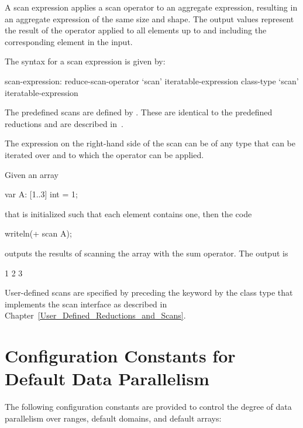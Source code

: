 A scan expression applies a scan operator to an aggregate expression,
resulting in an aggregate expression of the same size and shape.  The
output values represent the result of the operator applied to all
elements up to and including the corresponding element in the input.

The syntax for a scan expression is given by:
\begin{syntax}
scan-expression:
  reduce-scan-operator `scan' iteratable-expression
  class-type `scan' iteratable-expression
\end{syntax}

The predefined scans are defined by .  These
are identical to the predefined reductions and are described
in~.

The expression on the right-hand side of the scan can be of any type
that can be iterated over and to which the operator can be applied.

%
%
\begin{example}
Given an array
\begin{chapel}
var A: [1..3] int = 1;
\end{chapel}
that is initialized such that each element contains one, then the code
\begin{chapel}
writeln(+ scan A);
\end{chapel}
outputs the results of scanning the array with the sum operator.  The
output is
\begin{chapelprintoutput}{}
1 2 3
\end{chapelprintoutput}
\end{example}

User-defined scans are specified by preceding the keyword 
by the class type that implements the scan interface as described
in Chapter~\ref{User_Defined_Reductions_and_Scans}.

\section{Configuration Constants for Default Data Parallelism}
\label{data_parallel_knobs}

The following configuration constants are provided to control the
degree of data parallelism over ranges, default domains, and default
arrays:

